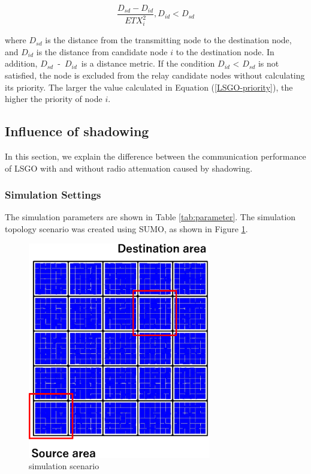 \documentclass[conference]{IEEEtran}
\begin{document}
\begin{equation}
\label{LSGO-priority}
\frac{D_{sd} - D_{id}}{ETX_{i}^{2}} ,   D_{id} < D_{sd}
\end{equation}

where $D_{sd}$ is the distance from the transmitting node to the destination node, and $D_{id}$ is the distance from candidate node $i$ to the destination node. In addition, \mbox{$D_{sd}$ - $D_{id}$ }is a distance metric. If the condition $D_{id}$ < $D_{sd}$ is not satisfied, the node is excluded from the relay candidate nodes without calculating its priority. The larger the value calculated in Equation (\ref{LSGO-priority}), the higher the priority of node $i$. 

\subsection{Influence of shadowing}
\label{shadowing_evaluation}
In this section, we explain the difference between the communication performance of LSGO with and without radio attenuation caused by shadowing. 


\subsubsection{Simulation Settings} 
The simulation parameters are shown in Table \ref{tab:parameter}. 
The simulation topology scenario was created using SUMO\cite{27}, as shown in Figure \ref{fig:scenario}. 

\begin{figure}[!ht]
\centering
\includegraphics[width=80mm]{figures/scenario.eps}
\caption{simulation scenario }
\label{fig:scenario}
\end{figure}
\end{document}
